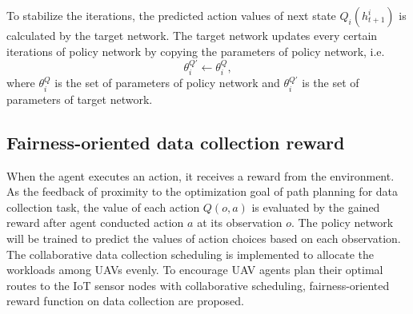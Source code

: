 \documentclass[journal]{IEEEtran}
\begin{document}
To stabilize the iterations, the predicted action values of next state $Q_i\left(h^i_{t+1}\right)$ is calculated by the target network. The target network updates every certain iterations of policy network by copying the parameters of policy network, i.e. 
\begin{equation}\label{update_target}
  \theta^{Q'}_{i}\gets\theta^{Q}_{i},
\end{equation}
where $\theta^{Q}_{i}$ is the set of parameters of policy network and $\theta^{Q'}_{i}$ is the set of parameters of target network. 

\subsection{Fairness-oriented data collection reward}\label{fairness_rwd}
When the agent executes an action, it receives a reward from the environment. As the feedback of proximity to the optimization goal of path planning for data collection task, the value of each action $Q\left({o,a}\right)$ is evaluated by the gained reward after agent conducted action $a$ at its observation $o$. The policy network will be trained to predict the values of action choices based on each observation. 
The collaborative data collection scheduling is implemented to allocate the workloads among UAVs evenly. To encourage UAV agents plan their optimal routes to the IoT sensor nodes with collaborative scheduling, fairness-oriented reward function on data collection are proposed. 
\end{document}
